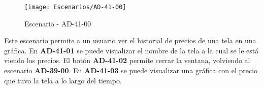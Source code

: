 \begin{figure}[H]
\centering
\texttt{[image: Escenarios/AD-41-00]}
\caption{Escenario - AD-41-00}
\label{fig:AD-41-00}
\end{figure}

Este escenario permite a un usuario ver el historial de precios de una tela en una gráfica. En \textbf{AD-41-01} se puede visualizar el nombre de la tela a la cual se le está viendo los precios. El botón \textbf{AD-41-02} permite cerrar la ventana, volviendo al escenario \textbf{AD-39-00}. En \textbf{AD-41-03} se puede visualizar una gráfica con el precio que tuvo la tela a lo largo del tiempo.
\clearpage
